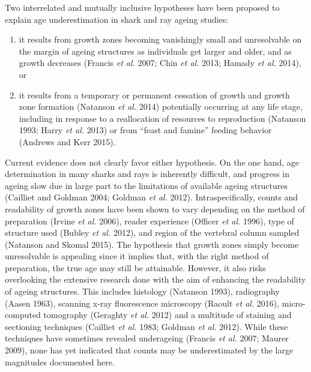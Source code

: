 \documentclass[]{article}
\begin{document}
Two interrelated and mutually inclusive hypotheses have been proposed to
explain age underestimation in shark and ray ageing studies:

\begin{enumerate}
\def\labelenumi{\arabic{enumi})}
\item
  it results from growth zones becoming vanishingly small and
  unresolvable on the margin of ageing structures as individuals get
  larger and older, and as growth decreases (Francis \emph{et al.} 2007;
  Chin \emph{et al.} 2013; Hamady \emph{et al.} 2014), or
\item
  it results from a temporary or permanent cessation of growth and
  growth zone formation (Natanson \emph{et al.} 2014) potentially
  occurring at any life stage, including in response to a reallocation
  of resources to reproduction (Natanson 1993; Harry \emph{et al.} 2013)
  or from ``feast and famine'' feeding behavior (Andrews and Kerr 2015).
\end{enumerate}

Current evidence does not clearly favor either hypothesis. On the one
hand, age determination in many sharks and rays is inherently difficult,
and progress in ageing slow due in large part to the limitations of
available ageing structures (Cailliet and Goldman 2004; Goldman \emph{et
al.} 2012). Intraspecifically, counts and readability of growth zones
have been shown to vary depending on the method of preparation (Irvine
\emph{et al.} 2006), reader experience (Officer \emph{et al.} 1996),
type of structure used (Bubley \emph{et al.} 2012), and region of the
vertebral column sampled (Natanson and Skomal 2015). The hypothesis that
growth zones simply become unresolvable is appealing since it implies
that, with the right method of preparation, the true age may still be
attainable. However, it also risks overlooking the extensive research
done with the aim of enhancing the readability of ageing structures.
This includes histology (Natanson 1993), radiography (Aasen 1963),
scanning x-ray fluorescence microscopy (Raoult \emph{et al.} 2016),
micro-computed tomography (Geraghty \emph{et al.} 2012) and a multitude
of staining and sectioning techniques (Cailliet \emph{et al.} 1983;
Goldman \emph{et al.} 2012). While these techniques have sometimes
revealed underageing (Francis \emph{et al.} 2007; Maurer 2009), none has
yet indicated that counts may be underestimated by the large magnitudes
documented here.
\end{document}
